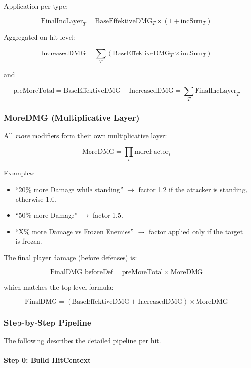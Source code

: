 Application per type:

\[
\text{FinalIncLayer}_T = \text{BaseEffektiveDMG}_T \times (1 + \text{incSum}_T)
\]

Aggregated on hit level:

\[
\text{IncreasedDMG} = \sum_T \left(\text{BaseEffektiveDMG}_T \times \text{incSum}_T\right)
\]

and

\[
\text{preMoreTotal} = \text{BaseEffektiveDMG} + \text{IncreasedDMG}
= \sum_T \text{FinalIncLayer}_T
\]

\subsubsection{MoreDMG (Multiplicative Layer)}

All \emph{more} modifiers form their own multiplicative layer:

\[
\text{MoreDMG} = \prod_i \text{moreFactor}_i
\]

Examples:

\begin{itemize}
	\item ``20\% more Damage while standing'' $\rightarrow$
	factor 1.2 if the attacker is standing, otherwise 1.0.
	\item ``50\% more Damage'' $\rightarrow$ factor 1.5.
	\item ``X\% more Damage vs Frozen Enemies'' $\rightarrow$
	factor applied only if the target is frozen.
\end{itemize}

The final player damage (before defenses) is:

\[
\text{FinalDMG\_beforeDef} = \text{preMoreTotal} \times \text{MoreDMG}
\]

which matches the top-level formula:

\[
\text{FinalDMG} = (\text{BaseEffektiveDMG} + \text{IncreasedDMG}) \times \text{MoreDMG}
\]

\subsubsection{Step-by-Step Pipeline}

The following describes the detailed pipeline per hit.

\paragraph{Step 0: Build HitContext}

